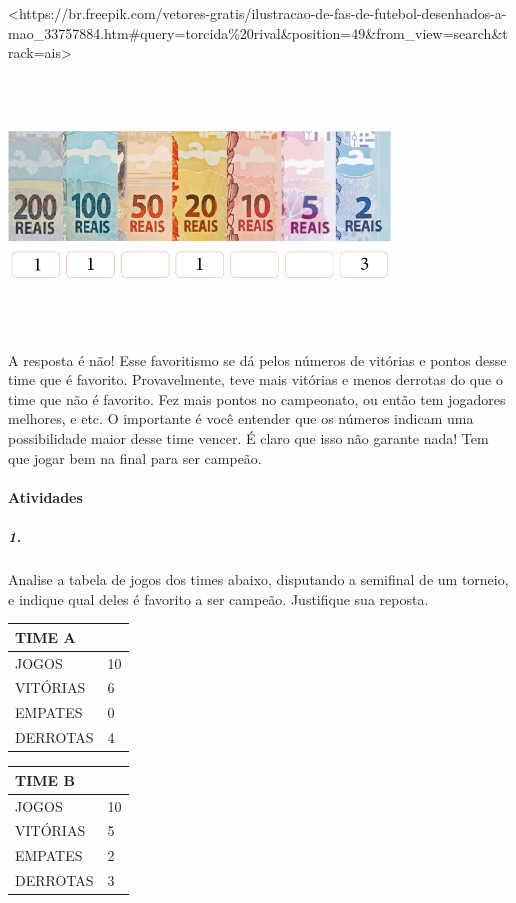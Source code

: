 \textless{}https://br.freepik.com/vetores-gratis/ilustracao-de-fas-de-futebol-desenhados-a-mao\_33757884.htm\#query=torcida\%20rival\&position=49\&from\_view=search\&track=ais\textgreater{}

\includegraphics[width=3.98958in,height=2.65972in]{media/image83.png}

A resposta é não! Esse favoritismo se dá pelos números de vitórias e
pontos desse time que é favorito. Provavelmente, teve mais vitórias e
menos derrotas do que o time que não é favorito. Fez mais pontos no
campeonato, ou então tem jogadores melhores, e etc. O importante é você
entender que os números indicam uma possibilidade maior desse time
vencer. É claro que isso não garante nada! Tem que jogar bem na final
para ser campeão.

\paragraph{Atividades }\label{atividades-5}

\subparagraph{1.}\label{section-68}

Analise a tabela de jogos dos times abaixo, disputando a semifinal de um
torneio, e indique qual deles é favorito a ser campeão. Justifique sua
reposta.

\begin{longtable}[]{@{}ll@{}}
\toprule
TIME A\tabularnewline
\midrule
\endhead
JOGOS & 10\tabularnewline
VITÓRIAS & 6\tabularnewline
EMPATES & 0\tabularnewline
DERROTAS & 4\tabularnewline
\bottomrule
\end{longtable}

\begin{longtable}[]{@{}ll@{}}
\toprule
TIME B\tabularnewline
\midrule
\endhead
JOGOS & 10\tabularnewline
VITÓRIAS & 5\tabularnewline
EMPATES & 2\tabularnewline
DERROTAS & 3\tabularnewline
\bottomrule
\end{longtable}

